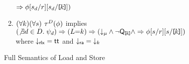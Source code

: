 \begin{figure*}
\begin{center}
\begin{minipage}{0.88\textwidth}
\begin{enumerate}
\begin{math}
{         \limplies \aForm[\bReg_\bEv/\aReg][\bReg_\bEv/\REF{\dVal}]
        )
      }      
    \end{math}
  \item %
    \begin{math}
      (\forall\dVal)
      (\forall\bReg)
    \end{math}
    $\aTr[\bEvs](\aForm)$ implies 
    \begin{math}
      (\not\exists\bEv\in\bEvs.\; \bForm_\bEv)
      \limplies (\cExp{=}\dVal)
      \limplies \PBR{        
        \Dmode{\amode}
        \land \lnot\QxREF{\dVal}
        \land
        \limplies \aForm[\bReg/\aReg][\bReg/\REF{\dVal}]
      }      
    \end{math}
    \\ where $\Dmode{\mRLX}=\TRUE$ and $\Dmode{\mRA}=\Dx{\dVal}$
  \end{enumerate}  
  \end{minipage}
  \end{center}
  \caption{Full Semantics of Load and Store}
  \label{fig:full}
\end{figure*}